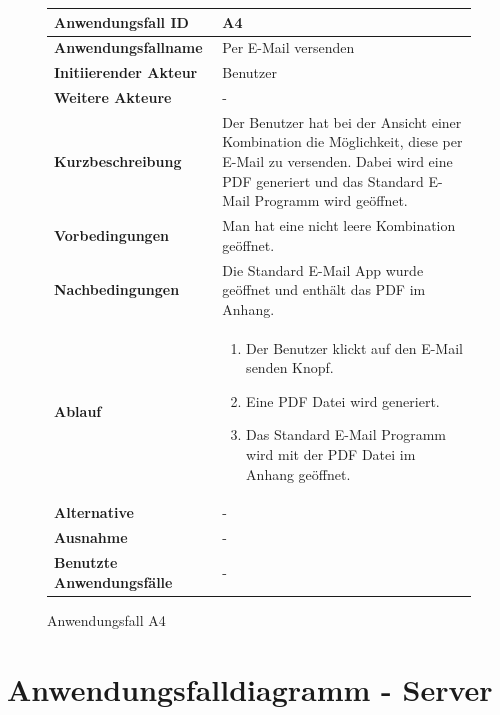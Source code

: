 \begin{figure}[h]
	\centering
	\begin{tabularx}{\textwidth}{ X | X }
		\textbf{Anwendungsfall ID} & A4 \\ \hline
		\textbf{Anwendungsfallname} & Per E-Mail versenden \\ \hline
		\textbf{Initiierender Akteur} & Benutzer \\ \hline
		\textbf{Weitere Akteure} & -  \\ \hline
		\textbf{Kurzbeschreibung} & Der Benutzer hat bei der Ansicht einer Kombination die Möglichkeit, diese per E-Mail zu versenden. Dabei wird eine PDF generiert und das Standard E-Mail Programm wird geöffnet.  \\ \hline
		\textbf{Vorbedingungen} & Man hat eine nicht leere Kombination geöffnet.  \\ \hline
		\textbf{Nachbedingungen} & Die Standard E-Mail App wurde geöffnet und enthält das PDF im Anhang.  \\ \hline
		\textbf{Ablauf} &
			\begin{enumerate}
				\item Der Benutzer klickt auf den E-Mail senden Knopf.
        \item Eine PDF Datei wird generiert.
				\item Das Standard E-Mail Programm wird mit der PDF Datei im Anhang geöffnet.
			\end{enumerate} \\ \hline
		\textbf{Alternative} &
			- \\ \hline
		\textbf{Ausnahme} &
			- \\ \hline
		\textbf{Benutzte Anwendungsfälle} & - \\ \hline
	\end{tabularx}
	\caption{Anwendungsfall A4}
	\label{fig:anwendungsfall-app-tabelle-xx-1}
\end{figure}

\newpage



\section{Anwendungsfalldiagramm - Server}

